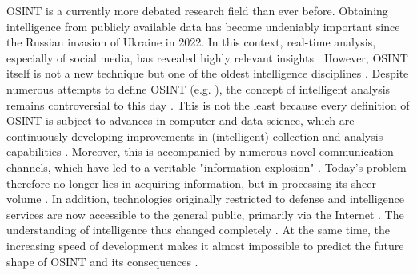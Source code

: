 \documentclass[10pt]{article}
\begin{document}
OSINT is a currently more debated research field than ever before. Obtaining intelligence
from publicly available data \cite{DosPassos.2017} has become undeniably important since the
Russian invasion of Ukraine in 2022. In this context, real-time analysis, especially of
social media, has revealed highly relevant insights \cite{Hatfield.2023, SmithBoyle.24.07.2023}.
However, OSINT itself is not a new technique \cite{PastorGalindo.2019, Schaurer.2010} but
one of the oldest intelligence disciplines \cite{Burke.2007}. Despite numerous attempts to
define OSINT (e.g. \cite{Hwang.2022, PastorGalindo.2020, Yogish.2021}), the concept of
intelligent analysis remains controversial to this day \cite{Ghioni.2023, Ish.2022,Williams.2018}.
This is not the least because every definition of OSINT is subject to advances in computer
and data science, which are continuously developing improvements in (intelligent) collection
and analysis capabilities \cite{Ghioni.2023, Williams.2018}. Moreover, this is accompanied
by numerous novel communication channels, which have led to a veritable "information
explosion" \cite{DosPassos.2017, Hwang.2022, Yogish.2021}. Today's problem therefore no
longer lies in acquiring information, but in processing its sheer volume \cite{Burke.2007}.
In addition, technologies originally restricted to defense and intelligence services are
now accessible to the general public, primarily via the Internet \cite{Hwang.2022, Williams.2018}.
The understanding of intelligence thus changed completely \cite{Dokman.2020}. At the same
time, the increasing speed of development makes it almost impossible to predict the future
shape of OSINT and its consequences \cite{Benes.2013}.
\end{document}
